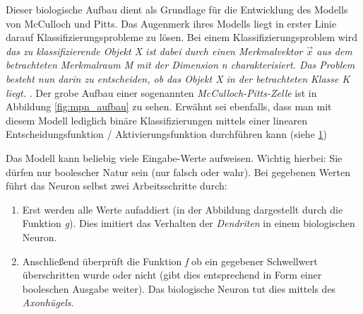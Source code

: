 Dieser biologische Aufbau dient als Grundlage für die Entwicklung des Modells von McCulloch und Pitts. Das Augenmerk ihres Modells liegt in erster Linie darauf Klassifizierungsprobleme zu lösen. Bei einem Klassifizierungsproblem wird \emph{das zu klassifizierende Objekt X ist dabei durch einen Merkmalvektor $\vec{x}$ aus dem betrachteten Merkmalraum M mit der Dimension n charakterisiert. Das Problem besteht nun darin zu entscheiden, ob das Objekt X in der betrachteten Klasse K liegt.} \cite{klproblem}. Der grobe Aufbau einer sogenannten \emph{McCulloch-Pitts-Zelle} ist in Abbildung \ref{fig:mpn_aufbau} zu sehen. Erwähnt sei ebenfalls, dass man mit diesem Modell lediglich binäre Klassifizierungen mittels einer linearen Entscheidungsfunktion / Aktivierungsfunktion durchführen kann (siehe \ref{fig:aufbau})


\begin{figure}%
  \centering
  \qquad
  \label{fig:aufbau}
\end{figure}

Das Modell kann beliebig viele Eingabe-Werte aufweisen. Wichtig hierbei: Sie dürfen nur boolescher Natur sein (nur falsch oder wahr). Bei gegebenen Werten führt das Neuron selbst zwei Arbeitsschritte durch: 
\begin{enumerate}

\item Erst werden alle Werte aufaddiert (in der Abbildung dargestellt durch die Funktion \emph{g}). Dies imitiert das Verhalten der \emph{Dendriten} in einem biologischen Neuron. 

\item Anschließend überprüft die Funktion \emph{f} ob ein gegebener Schwellwert überschritten wurde oder nicht (gibt dies entsprechend in Form einer booleschen Ausgabe weiter). Das biologische Neuron tut dies mittels des \emph{Axonhügels}. 

\end{enumerate}

